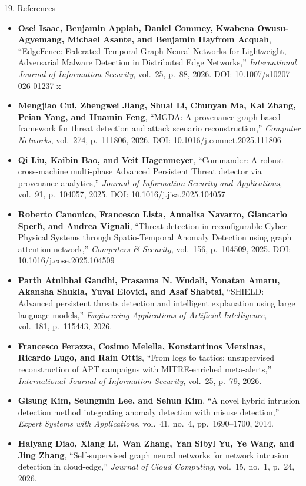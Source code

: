 \documentclass[aspectratio=169,10pt]{beamer}
\begin{document}
\begin{frame}[t]{19. References}
\vspace{-0.2em}
\fontsize{6.2pt}{8.0pt}\selectfont
\begin{itemize}\itemsep0.15em
  \item[\textbf{[1]}] \textbf{Osei Isaac, Benjamin Appiah, Daniel Commey, Kwabena Owusu-Agyemang, Michael Asante, and Benjamin Hayfrom Acquah}, ``EdgeFence: Federated Temporal Graph Neural Networks for Lightweight, Adversarial Malware Detection in Distributed Edge Networks,'' \textit{International Journal of Information Security}, vol.~25, p.~88, 2026. DOI: 10.1007/s10207-026-01237-x
  \item[\textbf{[2]}] \textbf{Mengjiao Cui, Zhengwei Jiang, Shuai Li, Chunyan Ma, Kai Zhang, Peian Yang, and Huamin Feng}, ``MGDA: A provenance graph-based framework for threat detection and attack scenario reconstruction,'' \textit{Computer Networks}, vol.~274, p.~111806, 2026. DOI: 10.1016/j.comnet.2025.111806
  \item[\textbf{[3]}] \textbf{Qi Liu, Kaibin Bao, and Veit Hagenmeyer}, ``Commander: A robust cross-machine multi-phase Advanced Persistent Threat detector via provenance analytics,'' \textit{Journal of Information Security and Applications}, vol.~91, p.~104057, 2025. DOI: 10.1016/j.jisa.2025.104057
  \item[\textbf{[4]}] \textbf{Roberto Canonico, Francesco Lista, Annalisa Navarro, Giancarlo Sperl{\'\i}, and Andrea Vignali}, ``Threat detection in reconfigurable Cyber--Physical Systems through Spatio-Temporal Anomaly Detection using graph attention network,'' \textit{Computers \& Security}, vol.~156, p.~104509, 2025. DOI: 10.1016/j.cose.2025.104509
  \item[\textbf{[5]}] \textbf{Parth Atulbhai Gandhi, Prasanna N. Wudali, Yonatan Amaru, Akansha Shukla, Yuval Elovici, and Asaf Shabtai}, ``SHIELD: Advanced persistent threats detection and intelligent explanation using large language models,'' \textit{Engineering Applications of Artificial Intelligence}, vol.~181, p.~115443, 2026.
  \item[\textbf{[6]}] \textbf{Francesco Ferazza, Cosimo Melella, Konstantinos Mersinas, Ricardo Lugo, and Rain Ottis}, ``From logs to tactics: unsupervised reconstruction of APT campaigns with MITRE-enriched meta-alerts,'' \textit{International Journal of Information Security}, vol.~25, p.~79, 2026.
  \item[\textbf{[7]}] \textbf{Gisung Kim, Seungmin Lee, and Sehun Kim}, ``A novel hybrid intrusion detection method integrating anomaly detection with misuse detection,'' \textit{Expert Systems with Applications}, vol.~41, no.~4, pp.~1690--1700, 2014.
  \item[\textbf{[8]}] \textbf{Haiyang Diao, Xiang Li, Wan Zhang, Yan Sibyl Yu, Ye Wang, and Jing Zhang}, ``Self-supervised graph neural networks for network intrusion detection in cloud-edge,'' \textit{Journal of Cloud Computing}, vol.~15, no.~1, p.~24, 2026.
\end{itemize}
\end{frame}
\end{document}
